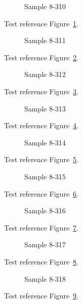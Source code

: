\begin{figure}[tbhp]
\caption{Sample 8-310}
\label{fig:sample-8-310}
\end{figure}

Test reference Figure~\ref{fig:sample-8-310}.

\begin{figure}[tbhp]
\caption{Sample 8-311}
\label{fig:sample-8-311}
\end{figure}

Test reference Figure~\ref{fig:sample-8-311}.

\begin{figure}[tbhp]
\caption{Sample 8-312}
\label{fig:sample-8-312}
\end{figure}

Test reference Figure~\ref{fig:sample-8-312}.

\begin{figure}[tbhp]
\caption{Sample 8-313}
\label{fig:sample-8-313}
\end{figure}

Test reference Figure~\ref{fig:sample-8-313}.

\begin{figure}[tbhp]
\caption{Sample 8-314}
\label{fig:sample-8-314}
\end{figure}

Test reference Figure~\ref{fig:sample-8-314}.

\begin{figure}[tbhp]
\caption{Sample 8-315}
\label{fig:sample-8-315}
\end{figure}

Test reference Figure~\ref{fig:sample-8-315}.

\begin{figure}[tbhp]
\caption{Sample 8-316}
\label{fig:sample-8-316}
\end{figure}

Test reference Figure~\ref{fig:sample-8-316}.

\begin{figure}[tbhp]
\caption{Sample 8-317}
\label{fig:sample-8-317}
\end{figure}

Test reference Figure~\ref{fig:sample-8-317}.

\begin{figure}[tbhp]
\caption{Sample 8-318}
\label{fig:sample-8-318}
\end{figure}

Test reference Figure~\ref{fig:sample-8-318}.

